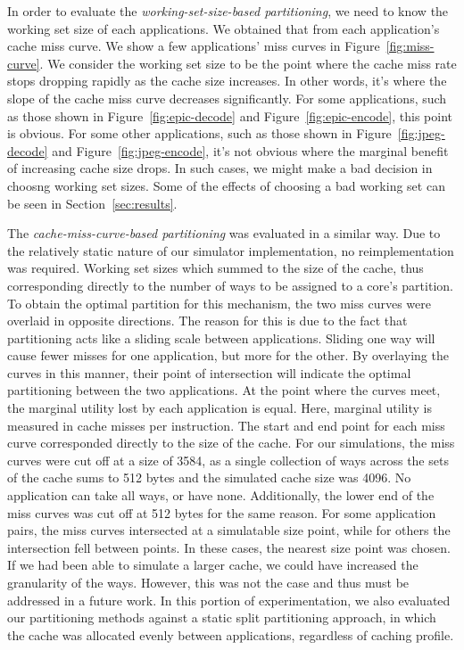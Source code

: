 \documentclass{acm_proc_article-sp}
\begin{document}
In order to evaluate the \emph{working-set-size-based partitioning}, we need to 
know the working set size of each applications. We obtained that from each 
application's cache miss curve. We show a few applications' miss curves in Figure~\ref{fig:miss-curve}. 
We consider the working set size to be the point where the cache miss rate stops dropping rapidly as the cache size increases. In other words, it's where the slope of the cache miss curve decreases 
significantly. For some applications, such as those shown in 
Figure~\ref{fig:epic-decode} and Figure~\ref{fig:epic-encode}, this point is 
obvious. For some other applications, such as those shown in 
Figure~\ref{fig:jpeg-decode} and Figure~\ref{fig:jpeg-encode}, it's not obvious
where the marginal benefit of increasing cache size drops. In such cases, we 
might make a bad decision in choosng working set sizes. Some of the
effects of choosing a bad working set can be seen in Section~\ref{sec:results}.

The \emph{cache-miss-curve-based partitioning} was evaluated in a similar way.
Due to the relatively static nature of our simulator implementation, no reimplementation
was required. Working set sizes which summed to the size of the cache, thus
corresponding directly to the number of ways to be assigned to a core's partition.
To obtain the optimal partition for this mechanism, the two miss curves were overlaid
in opposite directions. The reason for this is due to the fact that partitioning acts like a sliding scale
between applications. Sliding one way will cause fewer misses for one application, but more for the
other. By overlaying the curves in this manner, their point of intersection will indicate the optimal partitioning
between the two applications. At the point where the curves meet, the marginal utility lost by each application
is equal. Here, marginal utility is measured in cache misses per instruction. The start and end point for each miss curve corresponded directly to the size of the cache. For our simulations, the miss curves were cut off at a size of 3584,
as a single collection of ways across the sets of the cache sums to 512 bytes and the simulated cache size was 4096. No
application can take all ways, or have none. Additionally, the lower end of the miss curves was cut off at 512 bytes for the same reason. For some application pairs, the miss curves intersected at a simulatable
size point, while for others the intersection fell between points. In these cases, the nearest size point was chosen. 
If we had been able to simulate a larger cache, we could have increased the granularity of the ways. However,
this was not the case and thus must be addressed in a future work. In this portion of experimentation, we also evaluated
our partitioning methods against a static split partitioning approach, in which the cache was allocated evenly between applications, regardless of caching profile. 
\end{document}
